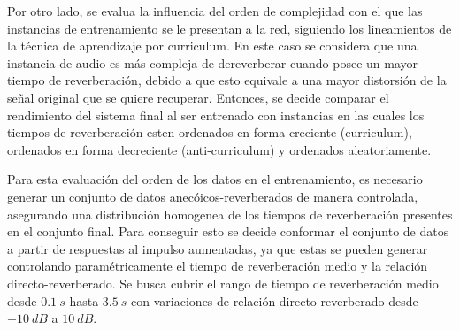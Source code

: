 Por otro lado, se evalua la influencia del orden de complejidad con el que las instancias de entrenamiento se le presentan a la red, siguiendo los lineamientos de la técnica de aprendizaje por curriculum. En este caso se considera que una instancia de audio es más compleja de dereverberar cuando posee un mayor tiempo de reverberación, debido a que esto equivale a una mayor distorsión de la señal original que se quiere recuperar. Entonces, se decide comparar el rendimiento del sistema final al ser entrenado con instancias en las cuales los tiempos de reverberación esten ordenados en forma creciente (curriculum), ordenados en forma decreciente (anti-curriculum) y ordenados aleatoriamente. 

Para esta evaluación del orden de los datos en el entrenamiento, es necesario generar un conjunto de datos anecóicos-reverberados de manera controlada, asegurando una distribución homogenea de los tiempos de reverberación presentes en el conjunto final. Para conseguir esto se decide conformar el conjunto de datos a partir de respuestas al impulso aumentadas, ya que estas se pueden generar controlando paramétricamente el tiempo de reverberación medio y la relación directo-reverberado. Se busca cubrir el rango de tiempo de reverberación medio desde $0.1 \ s$ hasta $3.5 \ s$ con variaciones de relación directo-reverberado desde $-10 \ dB$ a $10 \ dB$. 
